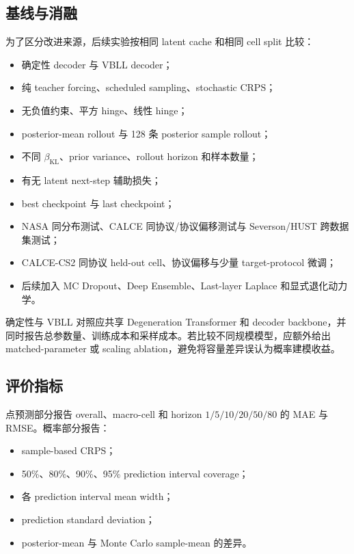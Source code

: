 \documentclass[11pt,a4paper,fontset=none]{ctexart}
\begin{document}
\subsection{基线与消融}

为了区分改进来源，后续实验按相同 latent cache 和相同 cell split 比较：
\begin{itemize}
  \item 确定性 decoder 与 VBLL decoder；
  \item 纯 teacher forcing、scheduled sampling、stochastic CRPS；
  \item 无负值约束、平方 hinge、线性 hinge；
  \item posterior-mean rollout 与 128 条 posterior sample rollout；
  \item 不同 $\beta_{\mathrm{KL}}$、prior variance、rollout horizon 和样本数量；
  \item 有无 latent next-step 辅助损失；
  \item best checkpoint 与 last checkpoint；
  \item NASA 同分布测试、CALCE 同协议/协议偏移测试与 Severson/HUST 跨数据集测试；
  \item CALCE-CS2 同协议 held-out cell、协议偏移与少量 target-protocol 微调；
  \item 后续加入 MC Dropout、Deep Ensemble、Last-layer Laplace 和显式退化动力学。
\end{itemize}

确定性与 VBLL 对照应共享 Degeneration Transformer 和 decoder backbone，并同时报告总参数量、训练成本和采样成本。若比较不同规模模型，应额外给出 matched-parameter 或 scaling ablation，避免将容量差异误认为概率建模收益。

\subsection{评价指标}

点预测部分报告 overall、macro-cell 和 horizon $1/5/10/20/50/80$ 的 MAE 与 RMSE。概率部分报告：
\begin{itemize}
  \item sample-based CRPS；
  \item 50\%、80\%、90\%、95\% prediction interval coverage；
  \item 各 prediction interval mean width；
  \item prediction standard deviation；
  \item posterior-mean 与 Monte Carlo sample-mean 的差异。
\end{itemize}
\end{document}
